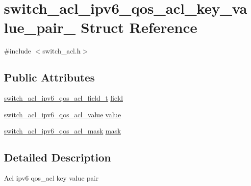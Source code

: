 \hypertarget{structswitch__acl__ipv6__qos__acl__key__value__pair__}{\section{switch\+\_\+acl\+\_\+ipv6\+\_\+qos\+\_\+acl\+\_\+key\+\_\+value\+\_\+pair\+\_\+ Struct Reference}
\label{structswitch__acl__ipv6__qos__acl__key__value__pair__}
}


{\ttfamily \#include $<$switch\+\_\+acl.\+h$>$}

\subsection*{Public Attributes}
\begin{DoxyCompactItemize}
\item 
\hyperlink{group__ACL_ga04fee2dc3a028f2c3102fefc6a94c9c0}{switch\+\_\+acl\+\_\+ipv6\+\_\+qos\+\_\+acl\+\_\+field\+\_\+t} \hyperlink{structswitch__acl__ipv6__qos__acl__key__value__pair___aa675494d1dcd3c6e98cfefc49f717122}{field}
\item 
\hyperlink{group__ACL_ga3e94be13b0d8d7a9970ae8755f88225e}{switch\+\_\+acl\+\_\+ipv6\+\_\+qos\+\_\+acl\+\_\+value} \hyperlink{structswitch__acl__ipv6__qos__acl__key__value__pair___a112aa6a99d10b17497c9e2ff293ac8ca}{value}
\item 
\hyperlink{group__ACL_ga870feb8d1167248e7f41128a8d18d63c}{switch\+\_\+acl\+\_\+ipv6\+\_\+qos\+\_\+acl\+\_\+mask} \hyperlink{structswitch__acl__ipv6__qos__acl__key__value__pair___a0576d1755fd5f9d6410ad5fe6c5e7682}{mask}
\end{DoxyCompactItemize}


\subsection{Detailed Description}
Acl ipv6 qos\+\_\+acl key value pair 

